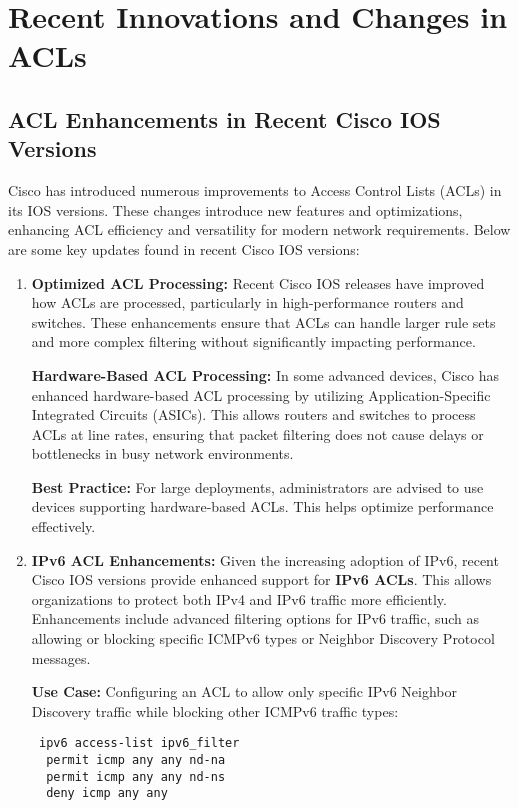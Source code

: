 \documentclass[11pt,a4paper]{article}
\begin{document}
\section*{Recent Innovations and Changes in ACLs}
    \subsection*{ACL Enhancements in Recent Cisco IOS Versions}
        Cisco has introduced numerous improvements to Access Control Lists (ACLs) in its IOS versions. These changes introduce new features and optimizations, enhancing ACL efficiency and versatility for modern network requirements. Below are some key updates found in recent Cisco IOS versions:
            \begin{enumerate}
                \item \textbf{Optimized ACL Processing:} Recent Cisco IOS releases have improved how ACLs are processed, particularly in high-performance routers and switches. These enhancements ensure that ACLs can handle larger rule sets and more complex filtering without significantly impacting performance.

                \textbf{Hardware-Based ACL Processing:} In some advanced devices, Cisco has enhanced hardware-based ACL processing by utilizing Application-Specific Integrated Circuits (ASICs). This allows routers and switches to process ACLs at line rates, ensuring that packet filtering does not cause delays or bottlenecks in busy network environments.

                \textbf{Best Practice:} For large deployments, administrators are advised to use devices supporting hardware-based ACLs. This helps optimize performance effectively.


                \item \textbf{IPv6 ACL Enhancements:} Given the increasing adoption of IPv6, recent Cisco IOS versions provide enhanced support for \textbf{IPv6 ACLs}. This allows organizations to protect both IPv4 and IPv6 traffic more efficiently. Enhancements include advanced filtering options for IPv6 traffic, such as allowing or blocking specific ICMPv6 types or Neighbor Discovery Protocol messages.

                \textbf{Use Case:} Configuring an ACL to allow only specific IPv6 Neighbor Discovery traffic while blocking other ICMPv6 traffic types:
\begin{lstlisting}
 ipv6 access-list ipv6_filter
  permit icmp any any nd-na
  permit icmp any any nd-ns
  deny icmp any any
\end{lstlisting}


\end{enumerate}
\end{document}
